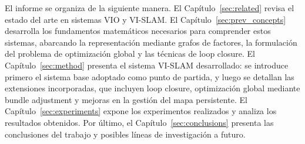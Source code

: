 El informe se organiza de la siguiente manera. El Capítulo~\ref{sec:related} revisa el estado del arte en sistemas VIO y VI-SLAM. El Capítulo~\ref{sec:prev_concepts} desarrolla los fundamentos matemáticos necesarios para comprender estos sistemas, abarcando la representación mediante grafos de factores, la formulación del problema de optimización global y las técnicas de loop closure. El Capítulo~\ref{sec:method} presenta el sistema VI-SLAM desarrollado: se introduce primero el sistema base adoptado como punto de partida, y luego se detallan las extensiones incorporadas, que incluyen loop closure, optimización global mediante bundle adjustment y mejoras en la gestión del mapa persistente. El Capítulo~\ref{sec:experiments} expone los experimentos realizados y analiza los resultados obtenidos. Por último, el Capítulo~\ref{sec:conclusions} presenta las conclusiones del trabajo y posibles líneas de investigación a futuro.
